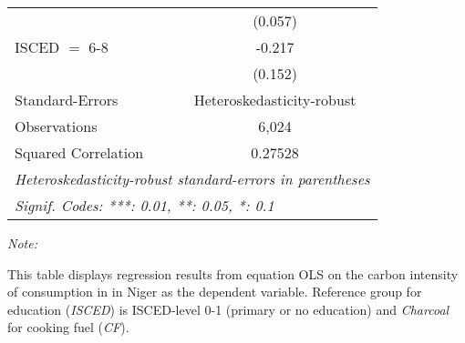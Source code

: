 \begin{table}[htbp!]
\begin{adjustbox}{width = 1\textwidth, max height = 0.95\textheight, center}
\begin{threeparttable}[b]
\begin{tabular}{lc}
                                & (0.057)\\   
            ISCED $=$ 6-8       & -0.217\\   
                                & (0.152)\\   
            \midrule 
            Standard-Errors     & Heteroskedasticity-robust \\   
            Observations        & 6,024\\  
            Squared Correlation & 0.27528\\  
            \midrule \midrule
            \multicolumn{2}{l}{\emph{Heteroskedasticity-robust standard-errors in parentheses}}\\
            \multicolumn{2}{l}{\emph{Signif. Codes: ***: 0.01, **: 0.05, *: 0.1}}\\
         \end{tabular}
         
         \begin{tablenotes}\item \medskip \textit{Note:}
            \item This table displays regression results from equation OLS on the carbon intensity of consumption in  in Niger as the dependent variable. Reference group for education (\textit{ISCED}) is ISCED-level 0-1 (primary or no education) and \textit{Charcoal} for cooking fuel (\textit{CF}).
         \end{tablenotes}
      \end{threeparttable}
   \end{adjustbox}
\end{table}



